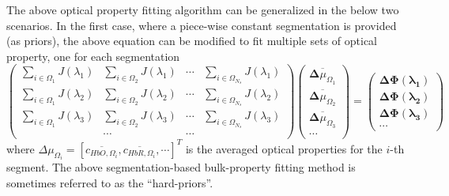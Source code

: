 \documentclass[12pt]{book}               %
\begin{document}
The above optical property fitting algorithm can be generalized in the below two scenarios. In the first case, where a piece-wise constant segmentation is provided (as priors), the above equation can be modified to fit multiple sets of optical property, one for each segmentation
\begin{equation}\label{eq:multispectral}
\left(
\begin{array}{llll}
\sum_{i\in\Omega_1}{J}(\lambda_1) & \sum_{i\in\Omega_2}{J}(\lambda_1) & \cdots & \sum_{i\in\Omega_{N_s}}{J}(\lambda_1) \\
\sum_{i\in\Omega_1}{J}(\lambda_2) & \sum_{i\in\Omega_2}{J}(\lambda_2) & \cdots & \sum_{i\in\Omega_{N_s}}{J}(\lambda_2) \\
\sum_{i\in\Omega_1}{J}(\lambda_3) & \sum_{i\in\Omega_2}{J}(\lambda_3) & \cdots & \sum_{i\in\Omega_{N_s}}{J}(\lambda_3) \\
 & \cdots & \cdots 
\end{array}\right)
\left(
\begin{array}{c}
\overline{\boldsymbol{\Delta}{\mu_{\Omega_1}}}\\
\overline{\boldsymbol{\Delta}{\mu_{\Omega_2}}}\\
\overline{\boldsymbol{\Delta}{\mu_{\Omega_3}}}\\
\cdots
\end{array}
\right)=\left(
\begin{array}{c}
\boldsymbol{\Delta\Phi(\lambda_1)}\\
\boldsymbol{\Delta\Phi(\lambda_2)}\\
\boldsymbol{\Delta\Phi(\lambda_3)}\\
\cdots
\end{array}\right)
\end{equation}
where $\Delta\mu_{\Omega_i}=\left[\overline{c_{HbO,\Omega_i}},\overline{c_{HbR,\Omega_i}},\cdots\right]^T$ is the averaged optical properties for the $i$-th segment. The above segmentation-based bulk-property fitting method is sometimes referred to as the ``hard-priors''.
\end{document}
